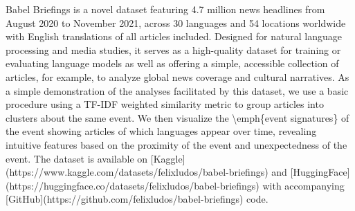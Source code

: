 Babel Briefings is a novel dataset featuring 4.7 million news headlines from August 2020 to November 2021, across 30 languages and 54 locations worldwide with English translations of all articles included. Designed for natural language processing and media studies, it serves as a high-quality dataset for training or evaluating language models as well as offering a simple, accessible collection of articles, for example, to analyze global news coverage and cultural narratives. As a simple demonstration of the analyses facilitated by this dataset, we use a basic procedure using a TF-IDF weighted similarity metric to group articles into clusters about the same event. We then visualize the \textbackslash{}emph\{event signatures\} of the event showing articles of which languages appear over time, revealing intuitive features based on the proximity of the event and unexpectedness of the event. The dataset is available on [Kaggle](https://www.kaggle.com/datasets/felixludos/babel-briefings) and [HuggingFace](https://huggingface.co/datasets/felixludos/babel-briefings) with accompanying [GitHub](https://github.com/felixludos/babel-briefings) code.